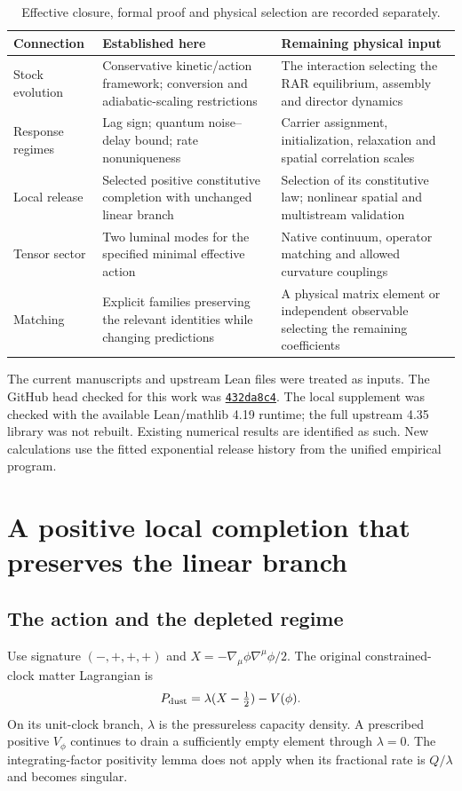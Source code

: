 \documentclass[11pt]{article}
\begin{document}
\begin{table}[h]
\small
\begin{tabularx}{\textwidth}{@{}p{}XX@{}}
\toprule
Connection & Established here & Remaining physical input \\
\midrule
Stock evolution & Conservative kinetic/action framework; conversion and
adiabatic-scaling restrictions & The interaction selecting the RAR equilibrium,
assembly and director dynamics \\
Response regimes & Lag sign; quantum noise--delay bound; rate nonuniqueness &
Carrier assignment, initialization, relaxation and spatial correlation scales \\
Local release & Selected positive constitutive completion with unchanged
linear branch & Selection of its constitutive law; nonlinear spatial and
multistream validation \\
Tensor sector & Two luminal modes for the specified minimal effective action &
Native continuum, operator matching and allowed curvature couplings \\
Matching & Explicit families preserving the relevant identities while changing
predictions & A physical matrix element or independent observable selecting the
remaining coefficients \\
\bottomrule
\end{tabularx}
\caption{Effective closure, formal proof and physical selection are recorded separately.}
\label{tab:status}
\end{table}

The current manuscripts and upstream Lean files were treated as inputs. The
GitHub head checked for this work was
\href{https://github.com/jakechinitz/Entropic-EFT-Lean/commit/432da8c4a8b169a17146b53e4155d6b37915a12f}{\texttt{432da8c4}}.
The local supplement was checked with the available Lean/mathlib 4.19 runtime;
the full upstream 4.35 library was not rebuilt. Existing numerical results are
identified as such. New calculations use the fitted exponential release
history from the unified empirical program.

\section{A positive local completion that preserves the linear branch}
\subsection{The action and the depleted regime}
Use signature $(-,+,+,+)$ and $X=-\nabla_\mu\phi\nabla^\mu\phi/2$.
The original constrained-clock matter Lagrangian is
\begin{equation}
 P_{\rm dust}=\lambda(X-\tfrac12)-V(\phi).
\end{equation}
On its unit-clock branch, $\lambda$ is the pressureless capacity density.
A prescribed positive $V_\phi$ continues to drain a sufficiently empty
element through $\lambda=0$. The integrating-factor positivity lemma does
not apply when its fractional rate is $Q/\lambda$ and becomes singular.
\end{document}
